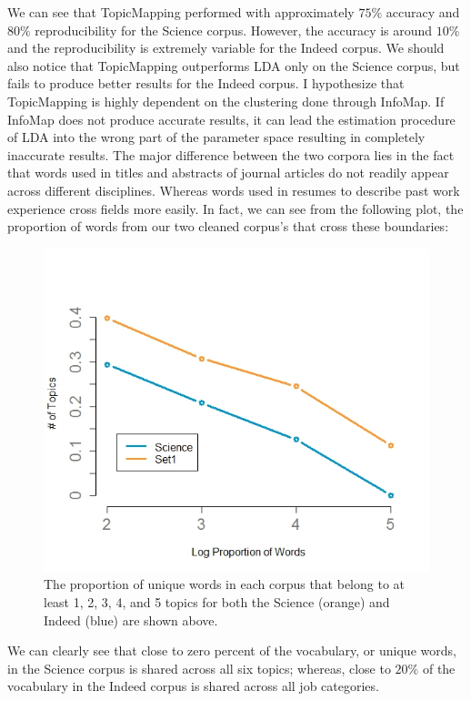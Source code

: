 \documentclass[12pt]{article}
\begin{document}
\noindent We can see that TopicMapping performed with approximately $75\%$ accuracy and $80\%$ reproducibility for the Science corpus. However, the accuracy is around $10\%$ and the reproducibility is extremely variable for the Indeed corpus. We should also notice that TopicMapping outperforms LDA only on the Science corpus, but fails to produce better results for the Indeed corpus. I hypothesize that TopicMapping is highly dependent on the clustering done through InfoMap. If InfoMap does not produce accurate results, it can lead the estimation procedure of LDA into the wrong part of the parameter space resulting in completely inaccurate results. The major difference between the two corpora lies in the fact that words used in titles and abstracts of journal articles do not readily appear across different disciplines. Whereas words used in resumes to describe past work experience cross fields more easily. In fact, we can see from the following plot, the proportion of words from our two cleaned corpus's that cross these boundaries:
\vspace{2mm}
\begin{figure}[H] \label{fig.3}
	\centering
	\includegraphics[scale=0.4]{Images/props.jpeg}
\caption{The proportion of unique words in each corpus that belong to at least 1, 2, 3, 4, and 5 topics for both the Science (orange) and Indeed (blue) are shown above.}
\end{figure}
\vspace{2mm}

\noindent We can clearly see that close to zero percent of the vocabulary, or unique words, in the Science corpus is shared across all six topics; whereas, close to $20\%$ of the vocabulary in the Indeed corpus is shared across all job categories.
\end{document}
